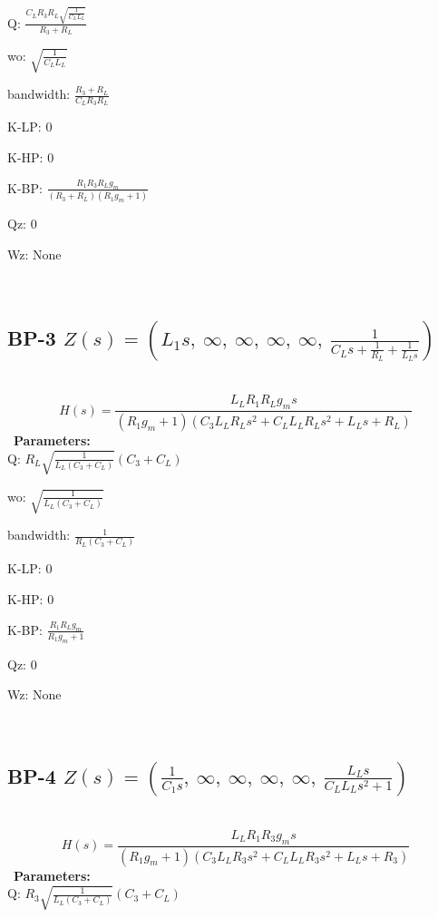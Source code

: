 \documentclass{article}
\begin{document}
Q: $\frac{C_{L} R_{3} R_{L} \sqrt{\frac{1}{C_{L} L_{L}}}}{R_{3} + R_{L}}$\ 

wo: $\sqrt{\frac{1}{C_{L} L_{L}}}$\ 

bandwidth: $\frac{R_{3} + R_{L}}{C_{L} R_{3} R_{L}}$\ 

K-LP: $0$\ 

K-HP: $0$\ 

K-BP: $\frac{R_{1} R_{3} R_{L} g_{m}}{\left(R_{3} + R_{L}\right) \left(R_{1} g_{m} + 1\right)}$\ 

Qz: $0$\ 

Wz: $\text{None}$\ 

\ 

\subsection{BP-3 $Z(s) = \left( L_{1} s, \  \infty, \  \infty, \  \infty, \  \infty, \  \frac{1}{C_{L} s + \frac{1}{R_{L}} + \frac{1}{L_{L} s}}\right)$ } \ 
\textbf{\[H(s) = \frac{L_{L} R_{1} R_{L} g_{m} s}{\left(R_{1} g_{m} + 1\right) \left(C_{3} L_{L} R_{L} s^{2} + C_{L} L_{L} R_{L} s^{2} + L_{L} s + R_{L}\right)}\] } \ 
\textbf{Parameters:}\\ 

Q: $R_{L} \sqrt{\frac{1}{L_{L} \left(C_{3} + C_{L}\right)}} \left(C_{3} + C_{L}\right)$\ 

wo: $\sqrt{\frac{1}{L_{L} \left(C_{3} + C_{L}\right)}}$\ 

bandwidth: $\frac{1}{R_{L} \left(C_{3} + C_{L}\right)}$\ 

K-LP: $0$\ 

K-HP: $0$\ 

K-BP: $\frac{R_{1} R_{L} g_{m}}{R_{1} g_{m} + 1}$\ 

Qz: $0$\ 

Wz: $\text{None}$\ 

\ 

\subsection{BP-4 $Z(s) = \left( \frac{1}{C_{1} s}, \  \infty, \  \infty, \  \infty, \  \infty, \  \frac{L_{L} s}{C_{L} L_{L} s^{2} + 1}\right)$ } \ 
\textbf{\[H(s) = \frac{L_{L} R_{1} R_{3} g_{m} s}{\left(R_{1} g_{m} + 1\right) \left(C_{3} L_{L} R_{3} s^{2} + C_{L} L_{L} R_{3} s^{2} + L_{L} s + R_{3}\right)}\] } \ 
\textbf{Parameters:}\\ 

Q: $R_{3} \sqrt{\frac{1}{L_{L} \left(C_{3} + C_{L}\right)}} \left(C_{3} + C_{L}\right)$\ 
\end{document}
